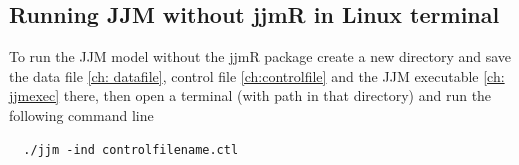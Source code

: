 \documentclass{article}
\begin{document}
 
 
   



\subsection{Running JJM without jjmR in Linux terminal} \label{ch: runwithoutjjmr}
To run the JJM model without the jjmR package create a new directory and save the data file \ref{ch: datafile}, control file \ref{ch:controlfile} and the JJM executable \ref{ch: jjmexec} there, then open a terminal (with path in that directory) and run the following command line
\begin{lstlisting}
  ./jjm -ind controlfilename.ctl
\end{lstlisting}
\end{document}
